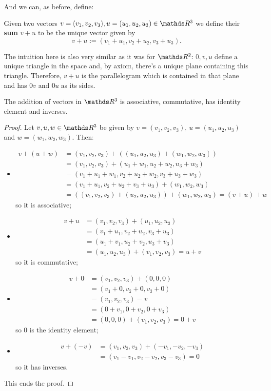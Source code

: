 And we can, as before, define:

\begin{df}
	Given two vectors $v=(v_1,v_2,v_3),u=(u_1,u_2,u_3)\in \R^3$ we define their \textbf{sum} $v+u$ to be the unique vector given by
	\[v+u:=(v_1+u_1,v_2+u_2,v_3+u_3).\]
\end{df}

The intuition here is also very similar as it was for $\R^2$: $0,v,u$ define a unique triangle in the space and, by axiom, there's a unique plane containing this triangle. Therefore, $v+u$ is the parallelogram which is contained in that plane and has $0v$ and $0u$ as its sides.

\begin{prop}
	The addition of vectors in $\R^3$ is associative, commutative, has identity element and inverses.
\end{prop}
\begin{proof}
	Let $v,u,w\in \R^3$ be given by $v=(v_1,v_2,v_3)$, $u=(u_1,u_2,u_3)$ and $w=(w_1,w_2,w_3)$. Then:
	
	\begin{itemize}
		\item \begin{align*}
			v+(u+w)&=(v_1,v_2,v_3)+((u_1,u_2,u_3)+(w_1,w_2,w_3))\\
			&=(v_1,v_2,v_3)+(u_1+w_1,u_2+w_2,u_3+w_3)\\
			&=(v_1+u_1+w_1,v_2+u_2+w_2,v_3+u_3+w_3)\\
			&=(v_1+u_1,v_2+u_2+v_3+u_3)+(w_1,w_2,w_3)\\
			&=((v_1,v_2,v_3)+(u_2,u_2,u_3))+(w_1,w_2,w_3)=(v+u)+w
		\end{align*} so it is associative;
		
		\item \begin{align*}
			v+u&=(v_1,v_2,v_3)+(u_1,u_2,u_3)\\
			&=(v_1+u_1,v_2+u_2,v_3+u_3)\\
			&=(u_1+v_1,u_2+v_2,u_3+v_3)\\
			&=(u_1,u_2,u_3)+(v_1,v_2,v_3)=u+v
		\end{align*}so it is commutative;
		
		\item  \begin{align*}
			v+0&=(v_1,v_2,v_3)+(0,0,0)\\
			&=(v_1+0,v_2+0,v_3+0)\\
			&=(v_1,v_2,v_3)=v\\
			&=(0+v_1,0+v_2,0+v_3)\\
			&=(0,0,0)+(v_1,v_2,v_3)=0+v
		\end{align*}so $0$ is the identity element;
		
		\item \begin{align*}
			v+(-v)&=(v_1,v_2,v_3)+(-v_1,-v_2,-v_3)\\
			&=(v_1-v_1,v_2-v_2,v_3-v_3)=0
		\end{align*}so it has inverses.
	\end{itemize}

This ends the proof.
\end{proof}